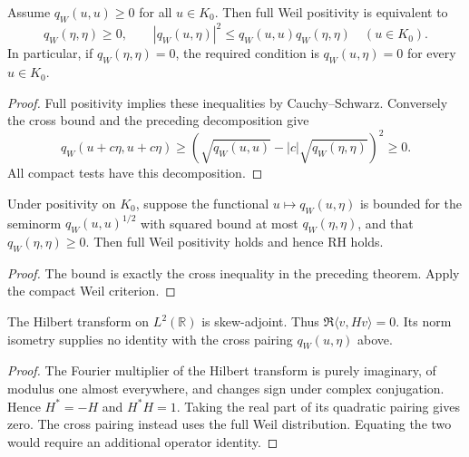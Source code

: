 \begin{theorem}
\label{v4-arith:w7-i:thm:burnol-reduction}
Assume $q_W(u,u)\ge0$ for all $u\in K_0$.
Then full Weil positivity is equivalent to
\begin{equation}
\label{v4-arith:w7-i:eq:burnol-reduction}
 q_W(\eta,\eta)\ge0,\qquad
 |q_W(u,\eta)|^2\le q_W(u,u)q_W(\eta,\eta)
 \quad(u\in K_0).
\end{equation}
In particular, if $q_W(\eta,\eta)=0$, the required condition is
$q_W(u,\eta)=0$ for every $u\in K_0$.
\end{theorem}
\begin{proof}
Full positivity implies these inequalities by Cauchy--Schwarz.
Conversely the cross bound and the preceding decomposition give
\[
 q_W(u+c\eta,u+c\eta)
 \ge\left(\sqrt{q_W(u,u)}-|c|\sqrt{q_W(\eta,\eta)}\right)^2\ge0.
\]
All compact tests have this decomposition.
\end{proof}

\begin{corollary}
\label{v4-arith:w7-i:cor:hilbert-sufficient}
\label{v4-arith:w7-i:eq:hilbert-sufficient}
Under positivity on $K_0$, suppose the functional
$u\mapsto q_W(u,\eta)$ is bounded for the seminorm
$q_W(u,u)^{1/2}$ with squared bound at most $q_W(\eta,\eta)$,
and that $q_W(\eta,\eta)\ge0$.
Then full Weil positivity holds and hence RH holds.
\end{corollary}
\begin{proof}
The bound is exactly the cross inequality in the preceding theorem.
Apply the compact Weil criterion.
\end{proof}

\begin{proposition}
\label{v4-arith:w7-i:prop:hilbert-rule-out}
The Hilbert transform on $L^2(\mathbb R)$ is skew-adjoint.
Thus $\Re\langle v,Hv\rangle=0$. Its norm isometry supplies no
identity with the cross pairing $q_W(u,\eta)$ above.
\end{proposition}
\begin{proof}
The Fourier multiplier of the Hilbert transform is purely
imaginary, of modulus one almost everywhere, and changes sign
under complex conjugation. Hence $H^*=-H$ and $H^*H=1$.
Taking the real part of its quadratic pairing gives zero.
The cross pairing instead uses the full Weil distribution.
Equating the two would require an additional operator identity.
\end{proof}


